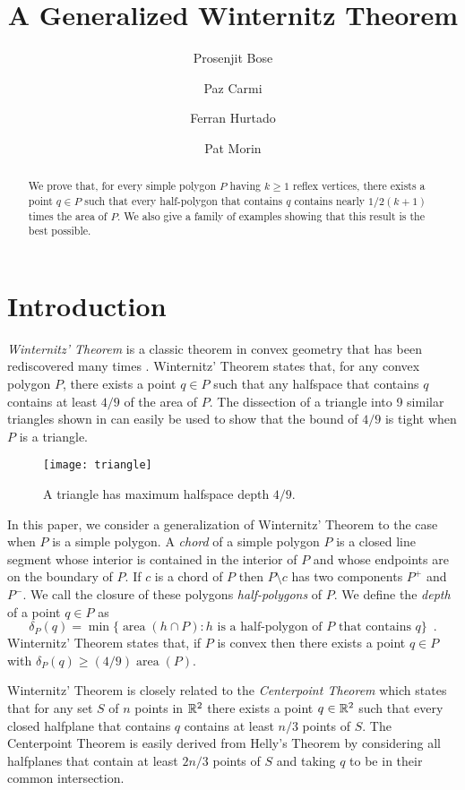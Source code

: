 \documentclass{article}
\title{A Generalized Winternitz Theorem}
\author{Prosenjit Bose \and 
	Paz Carmi \and
	Ferran Hurtado \and
	Pat Morin}
\DeclareMathOperator{\area}{area}
\begin{document}
\maketitle
\begin{abstract}
We prove that, for every simple polygon $P$ having $k\ge 1$ reflex
vertices, there exists a point $q\in P$ such that every half-polygon
that contains $q$ contains nearly $1/2(k+1)$ times the area of $P$.
We also give a family of examples showing that this result is the best
possible.
\end{abstract}

\section{Introduction}

\emph{Winternitz' Theorem} \cite[pp.~54--55]{b23} is a classic theorem
in convex geometry that has been rediscovered many times
\cite{e55b,ll35,n45,n58,yb51}.  Winternitz' Theorem states that, for
any convex polygon $P$, there exists a point $q\in P$ such that any
halfspace that contains $q$ contains at least $4/9$ of the area of
$P$.  The dissection of a triangle into 9 similar triangles shown in
 can easily be used to show that the bound of $4/9$
is tight when $P$ is a triangle.

\begin{figure}
  \begin{center}
    \texttt{[image: triangle]}
  \end{center}
  \caption{A triangle has maximum halfspace depth $4/9$.}
\end{figure}


In this paper, we consider a generalization of Winternitz' Theorem to
the case when $P$ is a simple polygon.  A \emph{chord} of a simple
polygon $P$ is a closed line segment whose interior is contained in
the interior of $P$ and whose endpoints are on the boundary of $P$.
If $c$ is a chord of $P$ then $P\setminus c$ has two components $P^+$
and $P^-$.  We call the closure of these polygons \emph{half-polygons}
of $P$.  We define the \emph{depth} of a point $q\in P$ as 
\[
     \delta_P(q) = \min\{\area(h\cap P) : \mbox{$h$ is a half-polygon
	of $P$ that contains $q$} \} \enspace .
\]
Winternitz' Theorem states that, if $P$ is convex then there exists a
point $q\in P$ with $\delta_P(q)\ge (4/9)\area(P)$.  

Winternitz' Theorem is closely related to the \emph{Centerpoint
Theorem} \cite{pa95,m02} which states that for any set $S$ of $n$
points in $\mathbb{R}^2$ there exists a point $q\in\mathbb{R}^2$ such that every
closed halfplane that contains $q$ contains at least $n/3$
points of $S$.  The Centerpoint Theorem is easily derived from Helly's
Theorem \cite{e93} by considering all halfplanes that contain at least
$2n/3$ points of $S$ and taking $q$ to be in their common
intersection.
\end{document}
